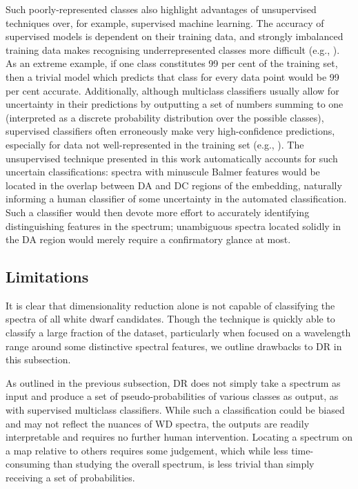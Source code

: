 \documentclass[fleqn,usenatbib]{mnras}
\begin{document}
Such poorly-represented classes also highlight advantages of unsupervised techniques over, for example, supervised machine learning.
The accuracy of supervised models is dependent on their training data, and strongly imbalanced training data makes recognising underrepresented classes more difficult (e.g., \citealt{he09, johnson19, das23}).
As an extreme example, if one class constitutes 99 per cent of the training set, then a trivial model which predicts that class for every data point would be 99 per cent accurate.
Additionally, although multiclass classifiers usually allow for uncertainty in their predictions by outputting a set of numbers summing to one (interpreted as a discrete probability distribution over the possible classes), supervised classifiers often erroneously make very high-confidence predictions, especially for data not well-represented in the training set (e.g., \citealt{nguyen15, guo17, hein19}).
The unsupervised technique presented in this work automatically accounts for such uncertain classifications: spectra with minuscule Balmer features would be located in the overlap between DA and DC regions of the embedding, naturally informing a human classifier of some uncertainty in the automated classification.
Such a classifier would then devote more effort to accurately identifying distinguishing features in the spectrum; unambiguous spectra located solidly in the DA region would merely require a confirmatory glance at most.

\subsection{Limitations}

It is clear that dimensionality reduction alone is not capable of classifying the spectra of all white dwarf candidates.
Though the technique is quickly able to classify a large fraction of the dataset, particularly when focused on a wavelength range around some distinctive spectral features, we outline drawbacks to DR in this subsection.

As outlined in the previous subsection, DR does not simply take a spectrum as input and produce a set of pseudo-probabilities of various classes as output, as with supervised multiclass classifiers.
While such a classification could be biased and may not reflect the nuances of WD spectra, the outputs are readily interpretable and requires no further human intervention.
Locating a spectrum on a map relative to others requires some judgement, which while less time-consuming than studying the overall spectrum, is less trivial than simply receiving a set of probabilities.
\end{document}
